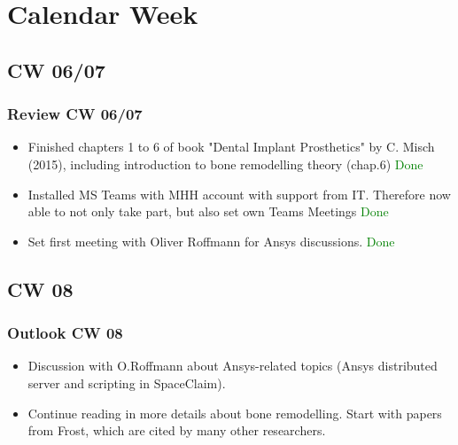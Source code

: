 \section{Calendar Week}
\subsection{CW 06/07}
\begin{frame}
  \frametitle{Review CW 06/07}
	\begin{itemize}
		\item Finished chapters 1 to 6 of book "Dental Implant Prosthetics" by C. Misch (2015), including introduction to bone remodelling theory (chap.6)  \textcolor{green}{Done}
		\item Installed MS Teams with MHH account with support from IT. Therefore now able to not only take part, but also set own Teams Meetings \textcolor{green}{Done}
		\item Set first meeting with Oliver Roffmann for Ansys discussions. \textcolor{green}{Done}
	\end{itemize}
\end{frame}


\subsection{CW 08}
\begin{frame}
  \frametitle{Outlook CW 08}
	\begin{itemize}
		\item Discussion with O.Roffmann about Ansys-related topics (Ansys distributed server and scripting in SpaceClaim).
		\item Continue reading in more details about bone remodelling. Start with papers from Frost, which are cited by many other researchers.
	\end{itemize}
\end{frame}

